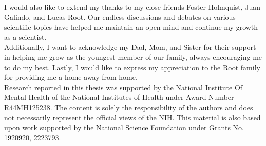 \documentclass[
12pt, %
oneside, %
english, %
singlespacing, %
liststotoc, %
headsepline, %
chapterinoneline, %
]{MastersDoctoralThesis} %
\begin{document}
\begin{acknowledgements}
I would also like to extend my thanks to my close friends Foster Holmquist, Juan Galindo, and Lucas Root. Our endless discussions and debates on various scientific topics have helped me maintain an open mind and continue my growth as a scientist. \\

Additionally, I want to acknowledge my Dad, Mom, and Sister for their support in helping me grow as the youngest member of our family, always encouraging me to do my best. Lastly, I would like to express my appreciation to the Root family for providing me a home away from home.\\

Research reported in this thesis was supported by the National Institute Of Mental Health of the National Institutes of Health under Award Number R44MH125238. The content is solely the responsibility of the authors and does not necessarily represent the official views of the NIH. This material is also based upon work supported by the National Science Foundation under Grants No. 1920920, 2223793.

\end{acknowledgements}


%
%
%

{
  \hypersetup{linkcolor=black}
  \tableofcontents %
}

{
  \hypersetup{linkcolor=black}
  \listoffigures
}

{
  \hypersetup{linkcolor=black}
  \listoftables %
}


{
  \hypersetup{linkcolor=black}
  \listofalgorithms %
}

\end{document}
